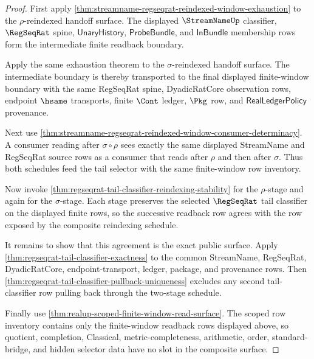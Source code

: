 \begin{proof}
First apply
\autoref{thm:streamname-regseqrat-reindexed-window-exhaustion} to the
$\rho$-reindexed handoff surface. The displayed $\StreamNameUp$ classifier,
$\RegSeqRat$ spine, $\mathsf{UnaryHistory}$, $\mathsf{ProbeBundle}$, and
$\mathsf{InBundle}$ membership rows form the intermediate finite readback
boundary.

Apply the same exhaustion theorem to the $\sigma$-reindexed handoff surface.
The intermediate boundary is thereby transported to the final displayed
finite-window boundary with the same RegSeqRat spine, DyadicRatCore
observation rows, endpoint $\hsame$ transports, finite $\Cont$ ledger, $\Pkg$
row, and $\mathsf{RealLedgerPolicy}$ provenance.

Next use
\autoref{thm:streamname-regseqrat-reindexed-window-consumer-determinacy}. A
consumer reading after $\sigma \circ \rho$ sees exactly the same displayed
StreamName and RegSeqRat source rows as a consumer that reads after $\rho$ and
then after $\sigma$. Thus both schedules feed the tail selector with the same
finite-window row inventory.

Now invoke
\autoref{thm:regseqrat-tail-classifier-reindexing-stability} for the
$\rho$-stage and again for the $\sigma$-stage. Each stage preserves the
selected $\RegSeqRat$ tail classifier on the displayed finite rows, so the
successive readback row agrees with the row exposed by the composite
reindexing schedule.

It remains to show that this agreement is the exact public surface. Apply
\autoref{thm:regseqrat-tail-classifier-exactness} to the common StreamName,
RegSeqRat, DyadicRatCore, endpoint-transport, ledger, package, and provenance
rows. Then
\autoref{thm:regseqrat-tail-classifier-pullback-uniqueness} excludes any
second tail-classifier row pulling back through the two-stage schedule.

Finally use \autoref{thm:realup-scoped-finite-window-read-surface}. The scoped
row inventory contains only the finite-window readback rows displayed above,
so quotient, completion, Classical, metric-completeness, arithmetic, order,
standard-bridge, and hidden selector data have no slot in the composite
surface.
\end{proof}

